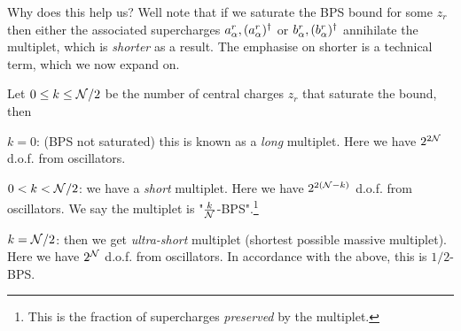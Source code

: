 Why does this help us? Well note that if we saturate the BPS bound for some $z_r$ then either the associated supercharges $a^r_{\alpha}, (a^r_{\alpha})^{\dagger}$ or $b^r_{\alpha}, (b^r_{\alpha})^{\dagger}$ annihilate the multiplet, which is \textit{shorter} as a result. The emphasise on shorter is a technical term, which we now expand on.

Let $0 \leq k \leq \mathcal{N}/2$  be the number of central charges $z_r$ that saturate the bound, then 
\ben[label=(\roman*)] 
    \item $k=0$: (BPS not saturated) this is known as a \textit{long} multiplet. Here we have $2^{2\mathcal{N}}$ d.o.f. from oscillators.
    \item $0<k<\mathcal{N}/2$: we have a \textit{short} multiplet. Here we have $2^{2(\mathcal{N}-k)}$ d.o.f. from oscillators. We say the multiplet is "$\frac{k}{\mathcal{N}}$-BPS".\footnote{This is the fraction of supercharges \textit{preserved} by the multiplet.}
    \item $k=\mathcal{N}/2$: then we get \textit{ultra-short} multiplet (shortest possible massive multiplet). Here we have $2^{\mathcal{N}}$ d.o.f. from oscillators. In accordance with the above, this is $1/2$-BPS.
\een 

